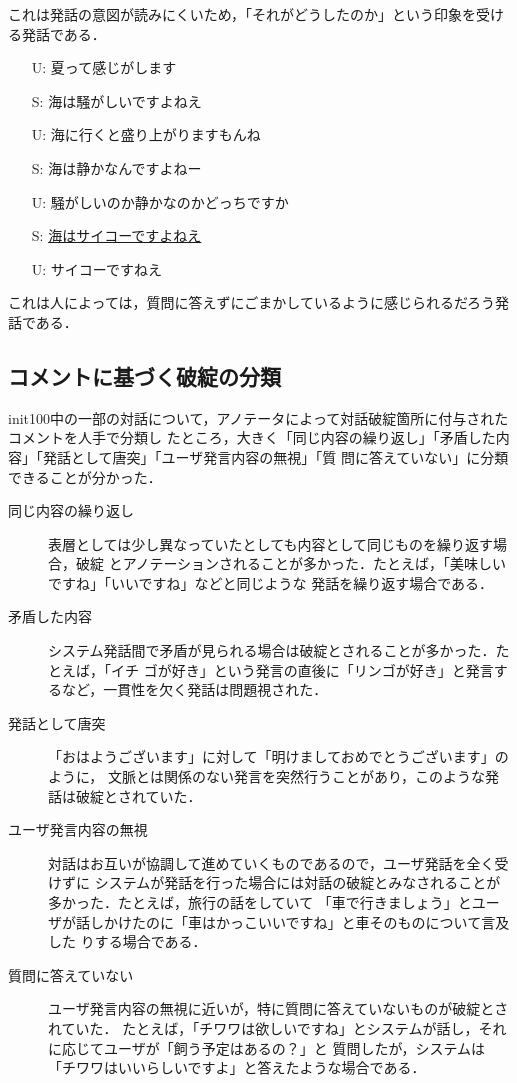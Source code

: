\documentclass[japanese]{jnlp_1.4}
\begin{document}
\noindent これは発話の意図が読みにくいため，「それがどうしたのか」という印象を受ける発話である．

\vspace{\lineskip}

\begin{itemize}
\itemsep=-1mm
\item[U:]	夏って感じがします\samepage
\item[S:]	海は騒がしいですよねえ\samepage
\item[U:]	海に行くと盛り上がりますもんね\samepage
\item[S:]	海は静かなんですよねー\samepage
\item[U:]	騒がしいのか静かなのかどっちですか\samepage
\item[S:]	\underline{海はサイコーですよねえ}\samepage
\item[U:]	サイコーですねえ\samepage
\end{itemize}

\noindent これは人によっては，質問に答えずにごまかしているように感じられるだろう発話である．


\subsection{コメントに基づく破綻の分類}
\label{commentcats}
 
init100中の一部の対話について，アノテータによって対話破綻箇所に付与されたコメントを人手で分類し
たところ，大きく「同じ内容の繰り返し」「矛盾した内容」「発話として唐突」「ユーザ発言内容の無視」「質
問に答えていない」に分類できることが分かった．

\begin{description}
\item[同じ内容の繰り返し]{表層としては少し異なっていたとしても内容として同じものを繰り返す場合，破綻
    とアノテーションされることが多かった．たとえば，「美味しいですね」「いいですね」などと同じような
    発話を繰り返す場合である．}
\item[矛盾した内容]{システム発話間で矛盾が見られる場合は破綻とされることが多かった．たとえば，「イチ
    ゴが好き」という発言の直後に「リンゴが好き」と発言するなど，一貫性を欠く発話は問題視された．}
\item[発話として唐突]{「おはようございます」に対して「明けましておめでとうございます」のように，
    文脈とは関係のない発言を突然行うことがあり，このような発話は破綻とされていた．}
\item[ユーザ発言内容の無視]{対話はお互いが協調して進めていくものであるので，ユーザ発話を全く受けずに
    システムが発話を行った場合には対話の破綻とみなされることが多かった．たとえば，旅行の話をしていて
    「車で行きましょう」とユーザが話しかけたのに「車はかっこいいですね」と車そのものについて言及した
    りする場合である．}
\item[質問に答えていない]{ユーザ発言内容の無視に近いが，特に質問に答えていないものが破綻とされていた．
    たとえば，「チワワは欲しいですね」とシステムが話し，それに応じてユーザが「飼う予定はあるの？」と
    質問したが，システムは「チワワはいいらしいですよ」と答えたような場合である．}
\end{description}
 
\end{document}
